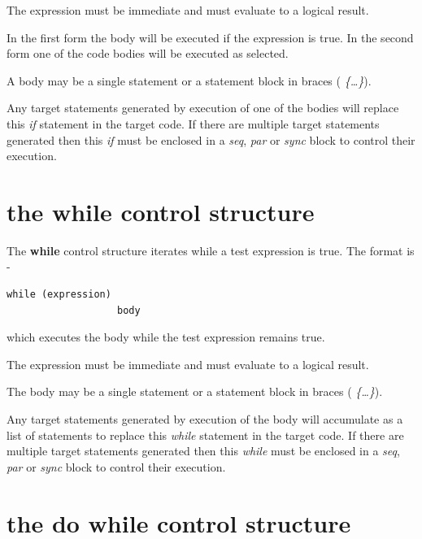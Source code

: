         The expression must be immediate and must evaluate to a logical
        result.

        In the first form the body will be executed if the
        expression is true. In the second form one of the code
        bodies will be executed as selected.
        
        A body may be a single statement or a statement block in braces ({\em
        \{\dots\}}).
        
        Any target statements generated by execution of one of the bodies will
        replace this {\em if} statement in the target code. If there are
        multiple target statements generated then this {\em if} must be
        enclosed in a {\em seq}, {\em par} or {\em sync} block to control
        their execution.



    \section{the {\bf while} control structure}\label{sec:im_while_struct}

        The {\bf while} control structure iterates while
        a test expression is true. The format is -
        \begin{lstlisting}[gobble=8, language=threepl]
               while (expression)
                   body
        \end{lstlisting}
        which executes the body while the test expression
        remains true.

        The expression must be immediate and must evaluate to a logical
        result.
        
        The body may be a single statement or a statement block in braces ({\em
        \{\dots\}}).
        
        Any target statements generated by execution of the body will
        accumulate as a list of statements to replace this {\em while}
        statement in the target code. If there are multiple target statements
        generated then this {\em while} must be enclosed in a {\em seq}, {\em
        par} or {\em sync} block to control their execution.



    \section{the {\bf do while} control structure}\label{sec:im_dowhile_struct}

